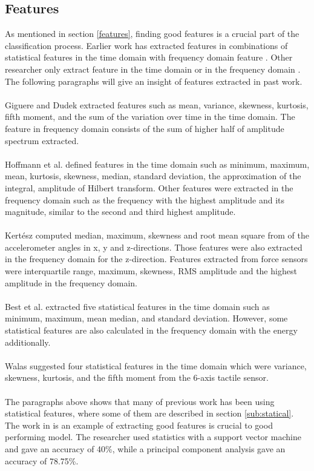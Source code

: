 \documentclass[USenglish]{ifimaster}  %
\begin{document}
\subsection{Features} \label{sub:relatedfeatures}
As mentioned in section \ref{features}, finding good features is a crucial part of the classification process. Earlier work has extracted features in combinations of statistical features in the time domain with frequency domain feature \cite{5152662,Giguere2009,5509309}. Other researcher only extract feature in the time domain \cite{walastactile} or in the frequency domain \cite{4543710} \cite{5979766}. The following paragraphs will give an insight of features extracted in past work.
\\
\\
Giguere and Dudek \cite{5152662} extracted features such as mean, variance, skewness, kurtosis, fifth moment, and the sum of the variation over time in the time domain. The feature in frequency domain consists of the sum of higher half of amplitude spectrum extracted.
\\
\\
Hoffmann et al. \cite{Hoffmann20141790} defined features in the time domain such as minimum, maximum, mean, kurtosis, skewness, median, standard deviation, the approximation of the integral, amplitude of Hilbert transform. Other features were extracted in the frequency domain such as the frequency with the highest amplitude and its magnitude, similar to the second and third highest amplitude.  
\\
\\
Kertész \cite{7387710} computed median, maximum, skewness and root mean square from of the accelerometer angles in x, y and z-directions. Those features were also extracted in the frequency domain for the z-direction. Features extracted from force sensors were interquartile range, maximum, skewness, RMS amplitude and the highest amplitude in the frequency domain.
\\
\\
Best et al. \cite{26b23e912c654fe4b7478fd910130195} extracted five statistical features in the time domain such as minimum, maximum, mean median, and standard deviation. However, some statistical features are also calculated in the frequency domain with the energy additionally.
\\
\\
Walas \cite{walastactile} suggested four statistical features in the time domain which were variance, skewness, kurtosis, and the fifth moment from the 6-axis tactile sensor. 
\\
\\
The paragraphs above shows that many of previous work has been using statistical features, where some of them are described in section \ref{sub:statical}. The work in \cite{5602459} is an example of extracting good features is crucial to good performing model. The researcher used statistics with a support vector machine and gave an accuracy of 40\%, while a principal component analysis gave an accuracy of 78.75\%.
	
\end{document}
